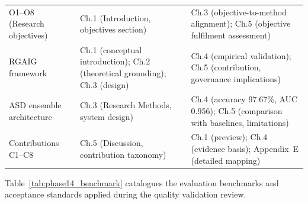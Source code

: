 \begin{xltabular}{\textwidth}{@{} p{0.22\textwidth} X X @{}}
O1--O8 (Research objectives)                                            & Ch.1 (Introduction, objectives section)                                      & Ch.3 (objective-to-method alignment); Ch.5 (objective fulfilment assessment) \\
\addlinespace
RGAIG framework                                                         & Ch.1 (conceptual introduction); Ch.2 (theoretical grounding); Ch.3 (design) & Ch.4 (empirical validation); Ch.5 (contribution, governance implications) \\
\addlinespace
ASD ensemble architecture                                                       & Ch.3 (Research Methods, system design)                                       & Ch.4 (accuracy 97.67\%, AUC 0.956); Ch.5 (comparison with baselines, limitations) \\
\addlinespace
Contributions C1--C8                                                    & Ch.5 (Discussion, contribution taxonomy)                                     & Ch.1 (preview); Ch.4 (evidence basis); Appendix~E (detailed mapping) \\
\end{xltabular}
\endgroup

\vspace{1.5em}

Table~\ref{tab:phase14_benchmark} catalogues the evaluation benchmarks and acceptance standards applied during the quality validation review.

